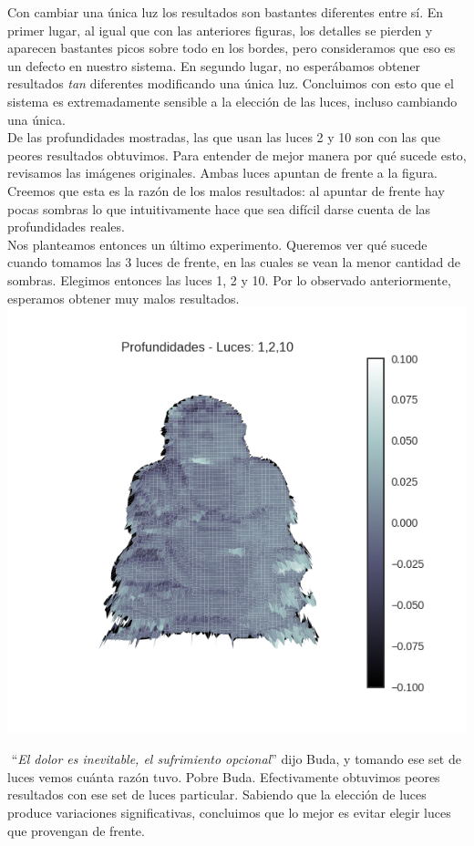 Con cambiar una única luz los resultados son bastantes diferentes entre sí. En primer lugar, al igual que con las anteriores figuras, los detalles se pierden y aparecen bastantes picos sobre todo en los bordes, pero consideramos que eso es un defecto en nuestro sistema. En segundo lugar, no esperábamos obtener resultados \textit{tan} diferentes modificando una única luz. Concluimos con esto que el sistema es extremadamente sensible a la elección de las luces, incluso cambiando una única. \\

De las profundidades mostradas, las que usan las luces 2 y 10 son con las que peores resultados obtuvimos. Para entender de mejor manera por qué sucede esto, revisamos las imágenes originales. Ambas luces apuntan de frente a la figura. Creemos que esta es la razón de los malos resultados: al apuntar de frente hay pocas sombras lo que intuitivamente hace que sea difícil darse cuenta de las profundidades reales. \\

\newpage
Nos planteamos entonces un último experimento. Queremos ver qué sucede cuando tomamos las 3 luces de frente, en las cuales se vean la menor cantidad de sombras. Elegimos entonces las luces 1, 2 y 10. Por lo observado anteriormente, esperamos obtener muy malos resultados. \\

{\centering
    \includegraphics[width=0.7\linewidth]{informe/imagenes/profundidades/buda1210.png}
}

$ $\newline
``\textit{El dolor es inevitable, el sufrimiento opcional}'' dijo Buda, y tomando ese set de luces vemos cuánta razón tuvo. Pobre Buda. Efectivamente obtuvimos peores resultados con ese set de luces particular. Sabiendo que la elección de luces produce variaciones significativas, concluimos que lo mejor es evitar elegir luces que provengan de frente. \\


